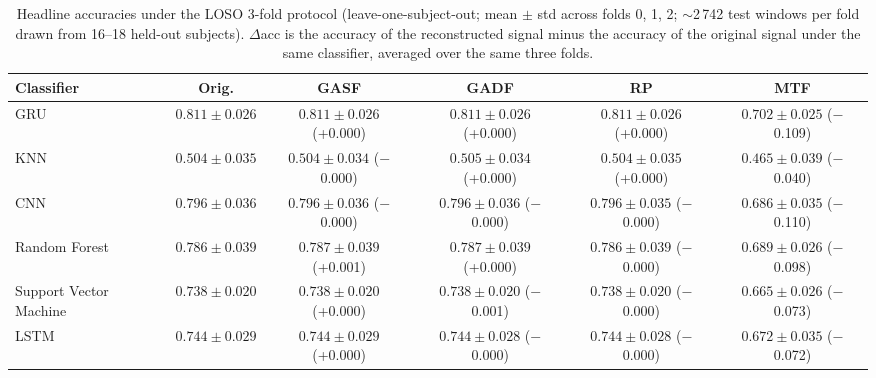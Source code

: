 \begin{table}[H]
\centering
\caption{Headline accuracies under the LOSO 3-fold protocol (leave-one-subject-out; mean $\pm$ std across folds 0, 1, 2; $\sim$2\,742 test windows per fold drawn from 16--18 held-out subjects). $\Delta$acc is the accuracy of the reconstructed signal minus the accuracy of the original signal under the same classifier, averaged over the same three folds.}
\label{tab:gadf_summary_loso}
\setlength{\tabcolsep}{3pt}
\footnotesize
\begin{tabular}{lccccc}
\toprule
\textbf{Classifier} & \textbf{Orig.} & \textbf{GASF} & \textbf{GADF} & \textbf{RP} & \textbf{MTF} \\
\midrule
GRU & $0.811 \pm 0.026$ & $0.811 \pm 0.026$ (+0.000) & $0.811 \pm 0.026$ (+0.000) & $0.811 \pm 0.026$ (+0.000) & $0.702 \pm 0.025$ ($-$0.109) \\
KNN & $0.504 \pm 0.035$ & $0.504 \pm 0.034$ ($-$0.000) & $0.505 \pm 0.034$ (+0.000) & $0.504 \pm 0.035$ (+0.000) & $0.465 \pm 0.039$ ($-$0.040) \\
CNN & $0.796 \pm 0.036$ & $0.796 \pm 0.036$ ($-$0.000) & $0.796 \pm 0.036$ ($-$0.000) & $0.796 \pm 0.035$ ($-$0.000) & $0.686 \pm 0.035$ ($-$0.110) \\
Random Forest & $0.786 \pm 0.039$ & $0.787 \pm 0.039$ (+0.001) & $0.787 \pm 0.039$ (+0.000) & $0.786 \pm 0.039$ ($-$0.000) & $0.689 \pm 0.026$ ($-$0.098) \\
Support Vector Machine & $0.738 \pm 0.020$ & $0.738 \pm 0.020$ (+0.000) & $0.738 \pm 0.020$ ($-$0.001) & $0.738 \pm 0.020$ ($-$0.000) & $0.665 \pm 0.026$ ($-$0.073) \\
LSTM & $0.744 \pm 0.029$ & $0.744 \pm 0.029$ (+0.000) & $0.744 \pm 0.028$ ($-$0.000) & $0.744 \pm 0.028$ ($-$0.000) & $0.672 \pm 0.035$ ($-$0.072) \\
\bottomrule
\end{tabular}
\end{table}


